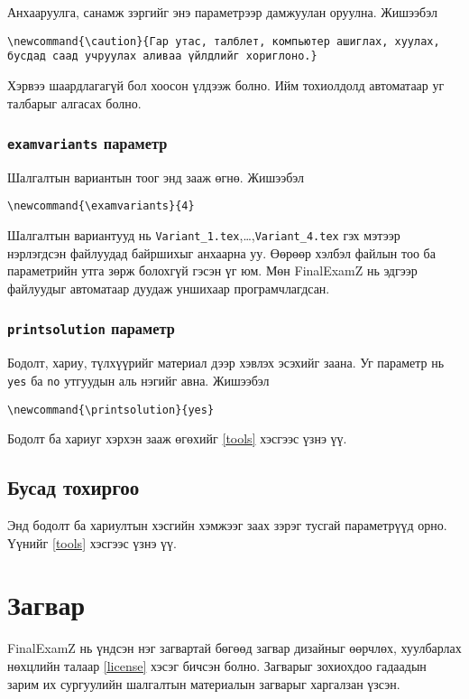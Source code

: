 \documentclass[10pt]{article}
\theoremstyle{definition}
\begin{document}
Анхааруулга, санамж зэргийг энэ параметрээр дамжуулан оруулна. Жишээбэл 
\begin{verbatim}
\newcommand{\caution}{Гар утас, талблет, компьютер ашиглах, хуулах, 
бусдад саад учруулах аливаа үйлдлийг хориглоно.}
\end{verbatim}
Хэрвээ шаардлагагүй бол хоосон үлдээж болно. Ийм тохиолдолд автоматаар уг талбарыг алгасах болно.

\subsubsection{\texttt{examvariants} параметр}

Шалгалтын вариантын тоог энд зааж өгнө. Жишээбэл 
\begin{verbatim}
\newcommand{\examvariants}{4}
\end{verbatim}
Шалгалтын вариантууд нь \texttt{Variant\_1.tex},\ldots,\texttt{Variant\_4.tex} гэх мэтээр нэрлэгдсэн файлуудад байршихыг анхаарна уу. Өөрөөр хэлбэл файлын тоо ба параметрийн утга зөрж болохгүй гэсэн үг юм. Мөн FinalExamZ нь эдгээр файлуудыг автоматаар дуудаж уншихаар програмчлагдсан.

\subsubsection{\texttt{printsolution} параметр}

Бодолт, хариу, түлхүүрийг материал дээр хэвлэх эсэхийг заана. Уг параметр нь \texttt{yes} ба \texttt{no} утгуудын аль нэгийг авна. Жишээбэл 
\begin{verbatim}
\newcommand{\printsolution}{yes}
\end{verbatim}
Бодолт ба хариуг хэрхэн зааж өгөхийг \ref{tools} хэсгээс үзнэ үү.

\subsection{Бусад тохиргоо}

Энд бодолт ба хариултын хэсгийн хэмжээг заах зэрэг тусгай параметрүүд орно. Үүнийг \ref{tools} хэсгээс үзнэ үү.

\section{Загвар}

FinalExamZ нь үндсэн нэг загвартай бөгөөд загвар дизайныг өөрчлөх, хуулбарлах нөхцлийн талаар \ref{license} хэсэг бичсэн болно. Загварыг зохиохдоо гадаадын зарим их сургуулийн шалгалтын материалын загварыг харгалзан үзсэн.
\end{document}
